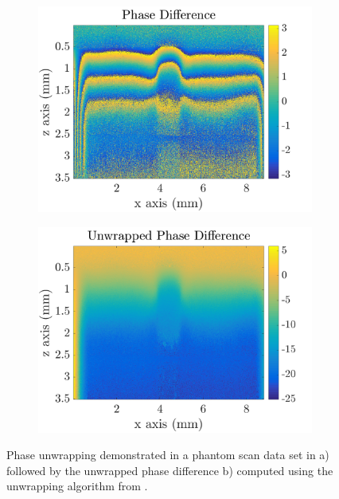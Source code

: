 \begin{figure}[hb!]
	\centering
	\begin{subfigure}{0.49\textwidth}
		\centering
		\includegraphics[width=\textwidth]{bground_figs/phase_difference.png}
	\end{subfigure}
	\begin{subfigure}{0.49\textwidth}
		\centering
		\includegraphics[width=\textwidth]{bground_figs/unwrapped_phase.png}
	\end{subfigure}
	\caption{Phase unwrapping demonstrated in a phantom scan data set in a) followed by the unwrapped phase difference b) computed using the unwrapping algorithm from \cite{kennedy_optical_2014}.}
	\label{phase_wrapping}	
\end{figure}

